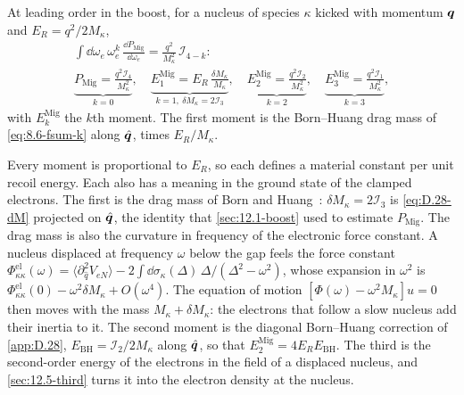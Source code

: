 \begin{keyresult}
At leading order in the boost, for a nucleus of species $\kappa$ kicked with momentum $\bm{q}$ and $E_R = q^2/2M_\kappa$,
\begin{equation}
  \begin{gathered}
  \int\dd\omega_e\,\omega_e^k\,\frac{\dd P_{\mathrm{Mig}}}{\dd\omega_e} = \frac{q^2}{M_\kappa^2}\,\mathcal{I}_{4-k} : \\
  \underbrace{P_{\mathrm{Mig}} = \frac{q^2\mathcal{I}_4}{M_\kappa^2}}_{k = 0} , \quad
  \underbrace{E^{\mathrm{Mig}}_1 = E_R\,\frac{\delta M_\kappa}{M_\kappa}}_{k = 1,\ \delta M_\kappa = 2\mathcal{I}_3} , \quad
  \underbrace{E^{\mathrm{Mig}}_2 = \frac{q^2\mathcal{I}_2}{M_\kappa^2}}_{k = 2} , \quad
  \underbrace{E^{\mathrm{Mig}}_3 = \frac{q^2\mathcal{I}_1}{M_\kappa^2}}_{k = 3} ,
  \end{gathered}
  \label{eq:12.5-moments}
\end{equation}
with $E^{\mathrm{Mig}}_k$ the $k$th moment. The first moment is the Born--Huang drag mass of \cref{eq:8.6-fsum-k} along $\hat{\bm{q}}$, times $E_R/M_\kappa$.
\end{keyresult}
\noindent Every moment is proportional to $E_R$, so each defines a material constant per unit recoil energy. Each also has a meaning in the ground state of the clamped electrons. The first is the drag mass of Born and Huang~\cite[App.~VIII]{born1954dynamical}: $\delta M_\kappa = 2\mathcal{I}_3$ is \cref{eq:D.28-dM} projected on $\hat{\bm{q}}$, the identity that \cref{sec:12.1-boost} used to estimate $P_{\mathrm{Mig}}$. The drag mass is also the curvature in frequency of the electronic force constant. A nucleus displaced at frequency $\omega$ below the gap feels the force constant $\Phi^{\mathrm{el}}_{\kappa\kappa}(\omega) = \langle\partial^2_{\hat q}V_{eN}\rangle - 2\int\dd\sigma_\kappa(\Delta)\,\Delta/(\Delta^2 - \omega^2)$, whose expansion in $\omega^2$ is $\Phi^{\mathrm{el}}_{\kappa\kappa}(0) - \omega^2\delta M_\kappa + O(\omega^4)$. The equation of motion $[\Phi(\omega) - \omega^2M_\kappa]u = 0$ then moves with the mass $M_\kappa + \delta M_\kappa$: the electrons that follow a slow nucleus add their inertia to it. The second moment is the diagonal Born--Huang correction of \cref{app:D.28}, $E_{\mathrm{BH}} = \mathcal{I}_2/2M_\kappa$ along $\hat{\bm{q}}$, so that $E^{\mathrm{Mig}}_2 = 4E_RE_{\mathrm{BH}}$. The third is the second-order energy of the electrons in the field of a displaced nucleus, and \cref{sec:12.5-third} turns it into the electron density at the nucleus.

